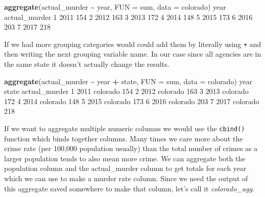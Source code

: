 \documentclass[
  12pt,
]{book}
\newenvironment{Shaded}{\begin{snugshade}}{\end{snugshade}}
\newcommand{\DataTypeTok}[1]{\textcolor[rgb]{0.13,0.29,0.53}{#1}}
\newcommand{\DecValTok}[1]{\textcolor[rgb]{0.00,0.00,0.81}{#1}}
\newcommand{\KeywordTok}[1]{\textcolor[rgb]{0.13,0.29,0.53}{\textbf{#1}}}
\newcommand{\NormalTok}[1]{#1}
\newcommand{\OperatorTok}[1]{\textcolor[rgb]{0.81,0.36,0.00}{\textbf{#1}}}
\newcommand{\StringTok}[1]{\textcolor[rgb]{0.31,0.60,0.02}{#1}}
\begin{document}
\begin{Shaded}
\begin{Highlighting}[]
\KeywordTok{aggregate}\NormalTok{(actual\_murder }\OperatorTok{\textasciitilde{}}\StringTok{ }\NormalTok{year, }\DataTypeTok{FUN =}\NormalTok{ sum, }\DataTypeTok{data =}\NormalTok{ colorado)}
\NormalTok{  year actual\_murder}
\DecValTok{1} \DecValTok{2011}           \DecValTok{154}
\DecValTok{2} \DecValTok{2012}           \DecValTok{163}
\DecValTok{3} \DecValTok{2013}           \DecValTok{172}
\DecValTok{4} \DecValTok{2014}           \DecValTok{148}
\DecValTok{5} \DecValTok{2015}           \DecValTok{173}
\DecValTok{6} \DecValTok{2016}           \DecValTok{203}
\DecValTok{7} \DecValTok{2017}           \DecValTok{218}
\end{Highlighting}
\end{Shaded}

If we had more grouping categories would could add them by literally using \texttt{+} and then writing the next grouping variable name. In our case since all agencies are in the same state it doesn't actually change the results.

\begin{Shaded}
\begin{Highlighting}[]
\KeywordTok{aggregate}\NormalTok{(actual\_murder }\OperatorTok{\textasciitilde{}}\StringTok{ }\NormalTok{year }\OperatorTok{+}\StringTok{ }\NormalTok{state, }\DataTypeTok{FUN =}\NormalTok{ sum, }\DataTypeTok{data =}\NormalTok{ colorado)}
\NormalTok{  year    state actual\_murder}
\DecValTok{1} \DecValTok{2011}\NormalTok{ colorado           }\DecValTok{154}
\DecValTok{2} \DecValTok{2012}\NormalTok{ colorado           }\DecValTok{163}
\DecValTok{3} \DecValTok{2013}\NormalTok{ colorado           }\DecValTok{172}
\DecValTok{4} \DecValTok{2014}\NormalTok{ colorado           }\DecValTok{148}
\DecValTok{5} \DecValTok{2015}\NormalTok{ colorado           }\DecValTok{173}
\DecValTok{6} \DecValTok{2016}\NormalTok{ colorado           }\DecValTok{203}
\DecValTok{7} \DecValTok{2017}\NormalTok{ colorado           }\DecValTok{218}
\end{Highlighting}
\end{Shaded}

If we want to aggregate multiple numeric columns we would use the \texttt{cbind()} function which binds together columns. Many times we care more about the crime rate (per 100,000 population usually) than the total number of crimes as a larger population tends to also mean more crime. We can aggregate both the population column and the actual\_murder column to get totals for each year which we can use to make a murder rate column. Since we need the output of this aggregate saved somewhere to make that column, let's call it \emph{colorado\_agg}.
\end{document}
